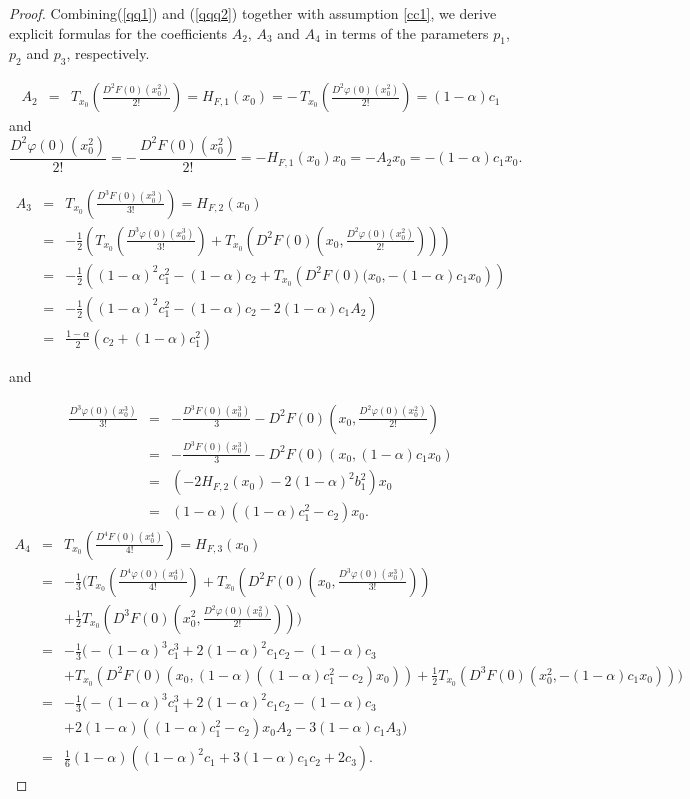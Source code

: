 \documentclass[11pt, reqno]{amsart}
\numberwithin{equation}{section}
\newcommand{\beas}{\begin{eqnarray*}}
\newcommand{\eeas}{\end{eqnarray*}}
\newcommand{\bea}{\begin{eqnarray}}
\newcommand{\eea}{\end{eqnarray}}
\begin{document}
\begin{proof}
Combining(\ref{qq1}) and (\ref{qqq2}) together with assumption \eqref{cc1}, we derive explicit formulas for the coefficients \(A_2\), \(A_3\)  and \(A_4\) in terms of the parameters \(p_1\), \(p_2\) and  \(p_3\), respectively.


\bea\label{A2}A_2&=&T_{x_0}\!\left(\frac{D^2F(0)(x_0^2)}{2!}\right)=H_{F,1}(x_0)
=-\,T_{x_0}\!\left(\frac{D^2\varphi(0)(x_0^2)}{2!}\right)
=(1-\alpha)c_1\eea
and
\[
\frac{D^2\varphi(0)(x_0^2)}{2!}=-\,\frac{D^2F(0)(x_0^2)}{2!}=-H_{F,1}(x_0)x_0
=-A_2x_0
=-(1-\alpha)c_1x_0.
\]

\bea\label{A3} A_3&=&T_{x_0}\!\left(\frac{D^3F(0)(x_0^3)}{3!}\right)
=H_{F,2}(x_0) \nonumber\\
&=&-\frac{1}{2}\left(T_{x_0}\!\left(\frac{D^3\varphi(0)(x_0^3)}{3!}\right)
+T_{x_0}\!\left(D^2F(0)\!\left(x_0,\frac{D^2\varphi(0)(x_0^2)}{2!}\right)\right)\right) \nonumber\\
&=&-\frac{1}{2}\left((1-\alpha)^2 c_1^2-(1-\alpha)c_2+T_{x_0}\!\left(D^2F(0)(x_0,-(1-\alpha)c_1x_0\right)\right) \nonumber\\
&=&-\frac{1}{2}\left((1-\alpha)^2 c_1^2-(1-\alpha)c_2-2(1-\alpha)c_1A_2\right)\nonumber\\
&=&\frac{1-\alpha}{2}\left(c_2+(1-\alpha) c_1^2\right)
\eea

and

\beas 
\frac{D^3\varphi(0)(x_0^3)}{3!}&=&-\frac{D^3F(0)(x_0^3)}{3}-D^2F(0)\!\left(x_0,\frac{D^2\varphi(0)(x_0^2)}{2!}\right)\\
&=&-\frac{D^3F(0)(x_0^3)}{3}-D^2F(0)(x_0,(1-\alpha) c_1 x_0)\\
&=&\left(-2H_{F,2}(x_0)-2(1-\alpha)^2 b_1^2\right) x_0\\
&=&(1-\alpha)((1-\alpha)c_1^2-c_2)x_0.\eeas
\bea\label{A4}
A_4&=& T_{x_0}\!\left(\frac{D^4F(0)(x_0^4)}{4!}\right)=H_{F,3}(x_0) \nonumber\\
&=&-\frac{1}{3}\Bigg(T_{x_0}\!\left(\frac{D^4\varphi(0)(x_0^4)}{4!}\right)+T_{x_0}\!\left(D^2F(0)\!\left(x_0,\frac{D^3\varphi(0)(x_0^3)}{3!}\right)\right) \nonumber\\
&& +\frac{1}{2}T_{x_0}\!\left(D^3F(0)\!\left(x_0^2,\frac{D^2\varphi(0)(x_0^2)}{2!}\right)\right)\Bigg) \nonumber\\
&=&-\frac{1}{3}\Bigg(-(1-\alpha)^3 c_1^3+2(1-\alpha)^2 c_1c_2-(1-\alpha)c_3 \nonumber\\
&&+
T_{x_0}\!\left(D^2F(0)(x_0,(1-\alpha)((1-\alpha)c_1^2-c_2)x_0)\right)+\frac{1}{2}T_{x_0}\!\left(D^3F(0)(x_0^2,-(1-\alpha)c_1x_0)\right)\Bigg) \nonumber\\
&=&-\frac{1}{3}\Bigg(-(1-\alpha)^3 c_1^3+2(1-\alpha)^2 c_1c_2-(1-\alpha)c_3\nonumber\\
&&+2(1-\alpha)((1-\alpha)c_1^2-c_2)x_0A_2-3(1-\alpha)c_1A_3\Big) \nonumber\\
&=&\frac{1}{6}(1-\alpha)\left((1-\alpha)^2 c_1 +3(1-\alpha)c_1c_2+2c_3\right).\eea
\end{proof}
\end{document}
